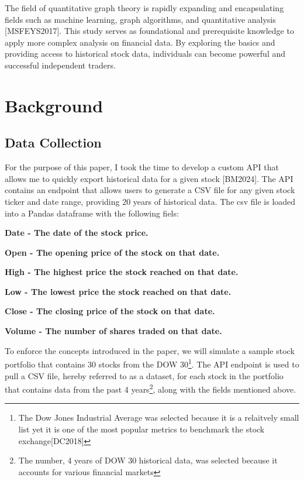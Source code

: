 \documentclass{article}
\begin{document}
The field of quantitative graph theory is rapidly expanding and encapsulating fields such as machine learning, graph algorithms, and quantitative analysis [MSFEYS2017]. This study serves as foundational and prerequisite knowledge to apply more complex analysis on financial data. By exploring the basics and providing  access to historical stock data, individuals can become powerful and successful independent traders.


\section{Background}

\subsection{Data Collection}

For the purpose of this paper, I took the time to develop a custom API that allows me to quickly export historical data for a given stock [BM2024]. The API contains an endpoint that allows users to generate a CSV file for any given stock ticker and date range, providing 20 years of historical data. The csv file is loaded into a Pandas dataframe with the following fiels:

\begin{compactitem}
    \item \bf{Date} - The date of the stock price. 
    \item \bf{Open} - The opening price of the stock on that date.
    \item \bf{High} - The highest price the stock reached on that date.
    \item \bf{Low} - The lowest price the stock reached on that date.
    \item \bf{Close} - The closing price of the stock on that date.
    \item \bf{Volume} - The number of shares traded on that date.
\end{compactitem}

To enforce the concepts introduced in the paper, we will simulate a sample stock portfolio that contains 30 stocks from the DOW 30\footnote{The Dow Jones Industrial Average was selected because it is a relaitvely small list yet it is one of the most popular metrics to benchmark the stock exchange[DC2018]}. The API endpoint is used to pull a CSV file, hereby referred to as a dataset, for each stock in the portfolio that contains data from the past 4 years\footnote{The number, 4 years of DOW 30 historical data, was selected because it accounts for various financial markets}, along with the fields mentioned above.
\end{document}
